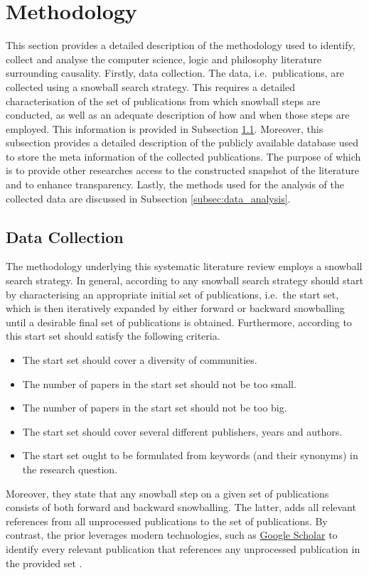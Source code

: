 \documentclass[11pt,a4paper]{book}
\theoremstyle{definition}
\theoremstyle{definition}
\theoremstyle{definition}
\theoremstyle{remark}
\begin{document}
\section{Methodology}
\label{sec:methodology}
This section provides a detailed description of the methodology used to identify, collect and analyse the computer science, logic and philosophy literature surrounding causality. Firstly, data collection. The data, i.e.\ publications, are collected using a snowball search strategy. This requires a detailed characterisation of the set of publications from which snowball steps are conducted, as well as an adequate description of how and when those steps are employed. This information is provided in Subsection \ref{subsec:data_collection}. 
Moreover, this subsection provides a detailed description of the publicly available database used to store the meta information of the collected publications. The purpose of which is to provide other researches access to the constructed snapshot of the literature and to enhance transparency. Lastly, the methods used for the analysis of the collected data are discussed in Subsection \ref{subsec:data_analysis}. 

\subsection{Data Collection}
\label{subsec:data_collection}
The methodology underlying this systematic literature review employs a snowball search strategy. 
In general, according to \parencite{wohlin2014guidelines} any snowball search strategy should start by characterising an appropriate initial set of publications, i.e.\ the start set, which is then iteratively expanded by either forward or backward snowballing until a desirable final set of publications is obtained.
Furthermore, according to \parencite{wohlin2014guidelines} this start set should satisfy the following criteria.
\begin{itemize}
\item The start set should cover a diversity of communities.
\item The number of papers in the start set should not be too small.
\item The number of papers in the start set should not be too big.
\item The start set should cover several different publishers, years and authors.
\item The start set ought to be formulated from keywords (and their synonyms) in the research question.
\end{itemize}
Moreover, they state that any snowball step on a given set of publications consists of both forward and backward snowballing.
The latter, adds all relevant references from all unprocessed publications to the set of publications. By contrast, the prior leverages modern technologies, such as \href{https://scholar.google.at/}{Google Scholar} to identify every relevant publication that references any unprocessed publication in the provided set \parencite{wohlin2014guidelines}.
\end{document}
